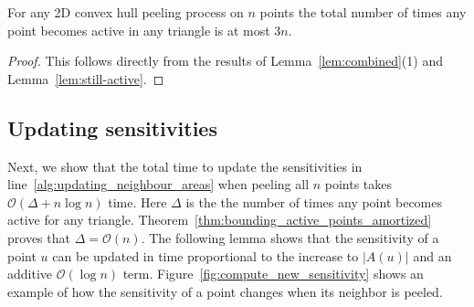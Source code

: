 \documentclass{cccg24}
\newcommand{\Oh}[1]{\mathcal{O}\!\lrParents{#1}}
\newcommand{\lrParents}[1]{\left( #1 \right)}
\newcommand{\lrSize}[1]{\left| #1 \right|}
\newcommand{\logn}{\log{n}}
\begin{document}
\begin{theorem}\label{thm:bounding_active_points_amortized}
    For any 2D convex hull peeling process on $n$ points the total number of times any point becomes active in any triangle is at most $3n$.
\end{theorem}

\begin{proof}
   This follows directly from the results of Lemma~\ref{lem:combined}(1) and Lemma~\ref{lem:still-active}.
\end{proof}

\subsection{Updating sensitivities}
Next, we show that the total time to update the sensitivities in line~\ref{alg:updating_neighbour_areas} when peeling all $n$ points takes $\Oh{\Delta + n \logn}$ time. Here $\Delta$ is the the number of times any point becomes active for any triangle. Theorem~\ref{thm:bounding_active_points_amortized} proves that $\Delta = \Oh{n}$. 
The following lemma shows that the sensitivity of a point $u$ can be updated in time proportional to the increase to $\lrSize{A(u)}$ and an additive $\Oh{\logn}$ term. 
Figure~\ref{fig:compute_new_sensitivity} shows an example of how the sensitivity of a point changes when its neighbor is peeled.
\end{document}
